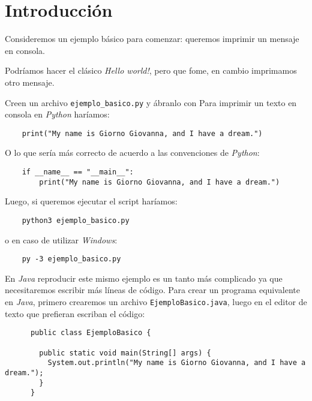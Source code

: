 \section{Introducción}
  Consideremos un ejemplo básico para comenzar: queremos imprimir un mensaje en consola.

  Podríamos hacer el clásico \textit{Hello world!}, pero que fome, en cambio imprimamos
  otro mensaje.

  Creen un archivo \texttt{ejemplo\_basico.py} y ábranlo con 
  Para imprimir un texto en consola en \textit{Python} haríamos:

  \begin{verbatim}
    print("My name is Giorno Giovanna, and I have a dream.")      
  \end{verbatim}

  O lo que sería más correcto de acuerdo a las convenciones de \textit{Python}:

  \begin{verbatim}
    if __name__ == "__main__":
        print("My name is Giorno Giovanna, and I have a dream.")
  \end{verbatim}

  Luego, si queremos ejecutar el script haríamos:

  \begin{verbatim}
    python3 ejemplo_basico.py
  \end{verbatim}

  o en caso de utilizar \textit{Windows}:

  \begin{verbatim}
    py -3 ejemplo_basico.py
  \end{verbatim}

  En \textit{Java} reproducir este mismo ejemplo es un tanto más complicado ya que 
  necesitaremos escribir más líneas de código.
  Para crear un programa equivalente en \textit{Java}, primero crearemos un archivo 
  \texttt{EjemploBasico.java}, luego en el editor de texto que prefieran escriban el 
  código:
  \begin{listing}[ht!]
    \begin{verbatim}
      public class EjemploBasico {

        public static void main(String[] args) {
          System.out.println("My name is Giorno Giovanna, and I have a dream.");
        }
      }
    \end{verbatim}
  \end{listing}

